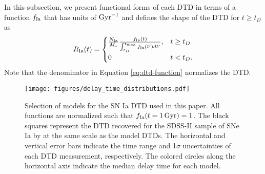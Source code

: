 \documentclass[twocolumn,twocolappendix]{aastex631}
\begin{document}
In this subsection, we present functional forms of each DTD in terms of a function $f_{\rm Ia}$ that has units of ${\rm Gyr}^{-1}$ and defines the shape of the DTD for $t\ge t_D$ as
\begin{equation}
    R_{\rm Ia}(t) = 
    \begin{cases}
        \frac{N_{\rm Ia}}{M_\star}
        \frac{f_{\rm Ia}(t)}{\int_{t_D}^{t_{\rm max}} f_{\rm Ia}(t') dt'}, & t \ge t_D \\
        0 & t < t_D.
    \end{cases}
    \label{eq:dtd-function}
\end{equation}
Note that the denominator in Equation \ref{eq:dtd-function} normalizes the DTD.

\begin{figure}
    \centering
    \texttt{[image: figures/delay\_time\_distributions.pdf]}
    \caption{Selection of models for the SN Ia DTD used in this paper. All functions are normalized such that $f_{\rm Ia}(t=1\,{\rm Gyr})=1$. The black squares represent the DTD recovered for the SDSS-II sample of SNe Ia by \citet{Maoz2012-SloanIIDTD} at the same scale as the model DTDs. The horizontal and vertical error bars indicate the time range and 1$\sigma$ uncertainties of each DTD measurement, respectively. The colored circles along the horizontal axis indicate the median delay time for each model.}
    \label{fig:dtds}
\end{figure}
\end{document}
